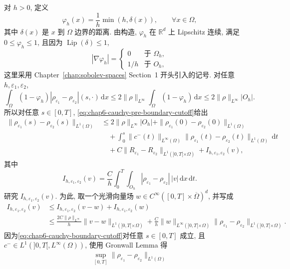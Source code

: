 \begin{sloppypar}
\begin{Proof}
\begin{itemize}
 对 $h>0$, 定义
 \[
  \varphi_h(x)=\frac1h\min(h,\delta(x)),\qquad\forall x\in\Omega,
 \]
 其中 $\delta(x)$ 是 $x$ 到 $\Omega$ 边界的距离. 由构造, $\varphi_h$ 在 $\mathbb R^d$ 上 Lipschitz 连续, 满足 $0\leq\varphi_h\leq1$, 且因为 $\operatorname{Lip}(\delta)\leq1$,
 \[
  |\nabla\varphi_h|=
  \begin{cases}
   0&\text{于 }\Omega_h,\\
   1/h&\text{于 }O_h,
  \end{cases}
 \]
 这里采用 Chapter~\ref{chap:sobolev-spaces} Section~1 开头引入的记号. 对任意 $h,\varepsilon_1,\varepsilon_2$,
 \[
 \int_\Omega(1-\varphi_h)|\rho_{\varepsilon_1}-\rho_{\varepsilon_2}|(s,\cdot)\,\mathrm dx
 \leq2\|\rho\|_{L^\infty}\int_\Omega(1-\varphi_h)\,\mathrm dx
 \leq2\|\rho\|_{L^\infty}|O_h|.
 \]
 所以对任意 $s\in[0,T]$, \eqref{eq:chap6-cauchy-pre-boundary-cutoff}给出
 \begin{equation}
 \begin{aligned}
 \|\rho_{\varepsilon_1}(s)-\rho_{\varepsilon_2}(s)\|_{L^1(\Omega)}
 &\leq2\|\rho\|_{L^\infty}|O_h|
 +\|\rho_{\varepsilon_1}(0)-\rho_{\varepsilon_2}(0)\|_{L^1(\Omega)}\\
 &\quad+\int_0^s\|c^-(t)\|_{L^\infty(\Omega)}
 \|\rho_{\varepsilon_1}(t)-\rho_{\varepsilon_2}(t)\|_{L^1(\Omega)}\,\mathrm dt\\
 &\quad+C\|R_{\varepsilon_1}-R_{\varepsilon_2}\|_{L^1(]0,T[\times\Omega)}
 +I_{h,\varepsilon_1,\varepsilon_2}(v),
 \end{aligned}
 \label{eq:chap6-cauchy-boundary-cutoff}
 \end{equation}
 其中
 \[
  I_{h,\varepsilon_1,\varepsilon_2}(v)
  =\frac Ch\int_0^T\int_{O_h}|\rho_{\varepsilon_1}-\rho_{\varepsilon_2}|\,|v|\,\mathrm dx\,\mathrm dt.
 \]
 研究 $I_{h,\varepsilon_1,\varepsilon_2}(v)$. 为此, 取一个光滑向量场 $w\in C^\infty([0,T]\times\overline\Omega)^d$, 并写成
 \[
 \begin{aligned}
 I_{h,\varepsilon_1,\varepsilon_2}(v)
 &\leq I_{h,\varepsilon_1,\varepsilon_2}(v-w)
 +I_{h,\varepsilon_1,\varepsilon_2}(w)\\
 &\leq\frac{2C\|\rho\|_{L^\infty}}h
 \|v-w\|_{L^1(]0,T[\times\Omega)}
 +\frac Ch\|w\|_{L^\infty(]0,T[\times\Omega)}
 \|\rho_{\varepsilon_1}-\rho_{\varepsilon_2}\|_{L^1(]0,T[\times\Omega)}.
 \end{aligned}
 \]
 因为\eqref{eq:chap6-cauchy-boundary-cutoff}对任意 $s\in[0,T]$ 成立, 且 $c^-\in L^1(]0,T[,L^\infty(\Omega))$, 使用 Gronwall Lemma 得
 \[
 \begin{aligned}
 \sup_{[0,T]}\|\rho_{\varepsilon_1}-\rho_{\varepsilon_2}\|_{L^1(\Omega)}

\end{aligned}\]
\end{itemize}
\end{Proof}
\end{sloppypar}
